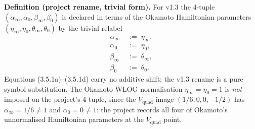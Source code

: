 \documentclass[11pt,reqno]{amsart}
\theoremstyle{plain}
\theoremstyle{definition}
\theoremstyle{remark}
\newcommand{\Vquad}{V_{\mathrm{quad}}}
\begin{document}
\medskip
\noindent\textbf{Definition (project rename, trivial form).}%
\hspace{0.5em}
For v1.3 the 4-tuple
$(\alpha_\infty, \alpha_0, \beta_\infty, \beta_0)$ is declared
in terms of the Okamoto Hamiltonian parameters
$(\eta_\infty, \eta_0, \theta_\infty, \theta_0)$ by the
trivial relabel
\begin{align}
  \alpha_\infty   &\;:=\; \eta_\infty,
                                           \tag{3.5.1a}\\
  \alpha_0        &\;:=\; \eta_0,
                                           \tag{3.5.1b}\\
  \beta_\infty    &\;:=\; \theta_\infty,
                                           \tag{3.5.1c}\\
  \beta_0         &\;:=\; \theta_0.
                                           \tag{3.5.1d}
\end{align}
Equations (3.5.1a)--(3.5.1d) carry no additive shift; the
v1.3 rename is a pure symbol substitution. The Okamoto WLOG
normalisation $\eta_\infty = \eta_0 = 1$ is {\em not} imposed
on the project's 4-tuple, since the $\Vquad$ image
$(1/6, 0, 0, -1/2)$ has $\alpha_\infty = 1/6 \ne 1$ and
$\alpha_0 = 0 \ne 1$: the project records all four of
Okamoto's unnormalised Hamiltonian parameters at the
$\Vquad$ point.
\end{document}
